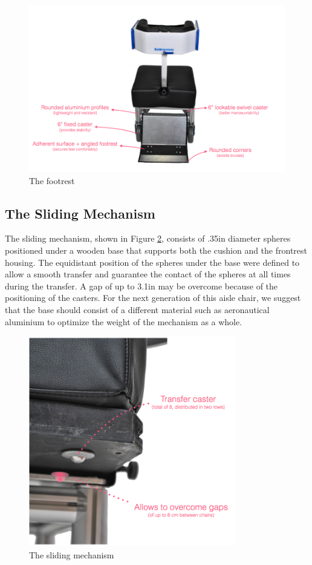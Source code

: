 \begin{figure}[h]
\centering
\includegraphics[width=13cm]{images/AisleWheelchair2.png}
\caption{The footrest}
\label{fig:footrest}
\end{figure}

\subsection{The Sliding Mechanism}

The sliding mechanism, shown in Figure \ref{fig:sliding},  consists of .35in diameter spheres positioned under a wooden base that supports both the cushion and the frontrest housing. The equidistant position of the spheres under the base were defined to allow a smooth transfer and  guarantee the contact of the spheres at all times during the transfer. A gap of up to 3.1in may be overcome because of the positioning of the casters. For the next generation of this aisle chair, we suggest that the base should consist of a different material such as aeronautical aluminium to optimize the weight of the mechanism as a whole.

\begin{figure}[h]
\centering
\includegraphics[width=9cm]{images/AisleWheelchair3.png}
\caption{The sliding mechanism}
\label{fig:sliding}
\end{figure}

